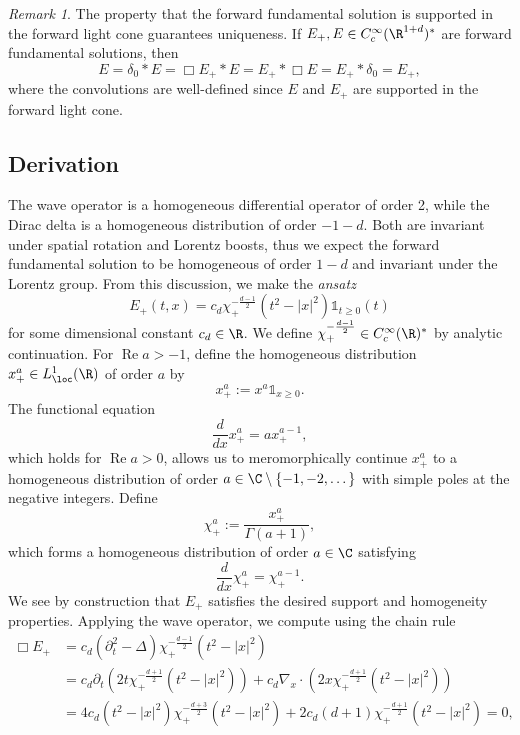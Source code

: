 \documentclass[reqno]{amsart}
\theoremstyle{definition}
\theoremstyle{remark}
\newtheorem*{remark}{Remark}
\renewcommand{\Re}{\operatorname{Re}}
\begin{document}
\begin{remark}
	The property that the forward fundamental solution is supported in the forward light cone guarantees uniqueness. If $E_+, E \in C^\infty_c (\R^{1 + d})^*$ are forward fundamental solutions, then 
		\[E= \delta_0 * E = \Box E_+ *E = E_+ * \Box E = E_+ * \delta_0 = E_+,\]
	where the convolutions are well-defined since $E$ and $E_+$ are supported in the forward light cone. 	
\end{remark}



\subsection{Derivation}

The wave operator is a homogeneous differential operator of order 2, while the Dirac delta is a homogeneous distribution of order $-1 - d$. Both are invariant under spatial rotation and Lorentz boosts, thus we expect the forward fundamental solution to be homogeneous of order $1 - d$ and invariant under the Lorentz group. From this discussion, we make the \textit{ansatz}
	\[ E_+ (t, x) = c_d \chi_+^{-\frac{d - 1}{2}} (t^2 - |x|^2) \mathbb 1_{t \geq 0} (t) \]
for some dimensional constant $c_d \in \R$. We define $\chi_+^{-\frac{d - 1}{2}} \in C^\infty_c (\R)^*$ by analytic continuation. For $\Re a > -1$, define the homogeneous distribution $x^a_+ \in L^1_{\loc} (\R)$ of order $a$ by 
	\[ x^a_+ := x^a \mathbb 1_{x \geq 0}. \]
The functional equation 
	\[ \frac{d}{dx} x^a_+ = a x^{a - 1}_+, \]	
which holds for $\Re a > 0$, allows us to meromorphically continue $x^a_+$ to a homogeneous distribution of order $a \in \C \setminus \{-1, -2, \dots \}$ with simple poles at the negative integers. Define
	\[ \chi^a_+ := \frac{x^a_+}{\Gamma (a + 1)}, \]
which forms a homogeneous distribution of order $a \in \C$ satisfying 
	\[ \frac{d}{dx} \chi^a_+ = \chi^{a - 1}_+. \]
We see by construction that $E_+$ satisfies the desired support and homogeneity properties. Applying the wave operator, we compute using the chain rule
	\begin{align*}
		 \Box E_+ 
		 	&= c_d (\partial_t^2 - \Delta)  \chi_+^{-\frac{d - 1}{2}} (t^2 - |x|^2) \\
		 	&= c_d \partial_t (2t \chi_+^{-\frac{d + 1}{2}} (t^2 - |x|^2) ) + c_d \nabla_x \cdot (2x \chi_+^{-\frac{d + 1}{2}} (t^2 - |x|^2) ) \\
		 	&= 4c_d  (t^2 - |x|^2) \chi_+^{-\frac{d + 3}{2}} (t^2 - |x|^2) + 2 c_d (d + 1) \chi_+^{-\frac{d + 1}{2}} (t^2 - |x|^2) = 0,
	\end{align*}	 
\end{document}
